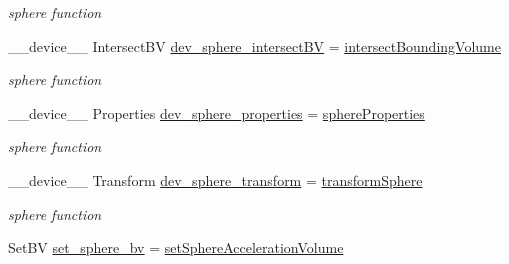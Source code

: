 \begin{DoxyCompactItemize}
\begin{DoxyCompactList}\small\item\em sphere function \end{DoxyCompactList}\item 
\+\_\+\+\_\+device\+\_\+\+\_\+ Intersect\+BV \hyperlink{group__device__pointers_ga10dd7617749ee8f0f1766add06b56943}{dev\+\_\+sphere\+\_\+intersect\+BV} = \hyperlink{group__intersection__test__prperties_gaf6bbee9e8a6ee564017fa94cd9e6ec63}{intersect\+Bounding\+Volume}\hypertarget{group__device__pointers_ga10dd7617749ee8f0f1766add06b56943}{}\label{group__device__pointers_ga10dd7617749ee8f0f1766add06b56943}

\begin{DoxyCompactList}\small\item\em sphere function \end{DoxyCompactList}\item 
\+\_\+\+\_\+device\+\_\+\+\_\+ Properties \hyperlink{group__device__pointers_ga4d14ea4399efac27739f61e12a806591}{dev\+\_\+sphere\+\_\+properties} = \hyperlink{group__intersection__test__prperties_gae821d5671069271f7c39d22ca8950f3d}{sphere\+Properties}\hypertarget{group__device__pointers_ga4d14ea4399efac27739f61e12a806591}{}\label{group__device__pointers_ga4d14ea4399efac27739f61e12a806591}

\begin{DoxyCompactList}\small\item\em sphere function \end{DoxyCompactList}\item 
\+\_\+\+\_\+device\+\_\+\+\_\+ Transform \hyperlink{group__device__pointers_gaede5be8cca4942f24473afcbdaa177e4}{dev\+\_\+sphere\+\_\+transform} = \hyperlink{group__intersection__test__prperties_ga6fe7123c4c4bdf775eac1231bc37c490}{transform\+Sphere}\hypertarget{group__device__pointers_gaede5be8cca4942f24473afcbdaa177e4}{}\label{group__device__pointers_gaede5be8cca4942f24473afcbdaa177e4}

\begin{DoxyCompactList}\small\item\em sphere function \end{DoxyCompactList}\item 
Set\+BV \hyperlink{group__device__pointers_gac53e785e30a603faf7fd77856e39cd0f}{set\+\_\+sphere\+\_\+bv} = \hyperlink{group__intersection__test__prperties_gafd2f15ce4a55fb0d8daee0bff024b67b}{set\+Sphere\+Acceleration\+Volume}\hypertarget{group__device__pointers_gac53e785e30a603faf7fd77856e39cd0f}{}\label{group__device__pointers_gac53e785e30a603faf7fd77856e39cd0f}


\end{DoxyCompactItemize}
